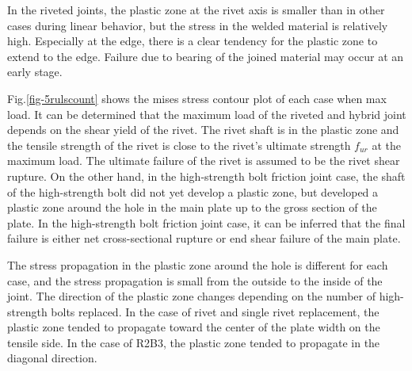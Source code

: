 In the riveted joints, the plastic zone at the rivet axis is smaller than in other cases during linear behavior, but the stress in the welded material is relatively high. Especially at the edge, there is a clear tendency for the plastic zone to extend to the edge. Failure due to bearing of the joined material may occur at an early stage.


Fig.\ref{fig-5rulscount} shows the mises stress contour plot of each case when max load. It can be determined that the maximum load of the riveted and hybrid joint depends on the shear yield of the rivet. The rivet shaft is in the plastic zone and the tensile strength of the rivet is close to the rivet's ultimate strength $f_{ur}$ at the maximum load. The ultimate failure of the rivet is assumed to be the rivet shear rupture. On the other hand, in the high-strength bolt friction joint case, the shaft of the high-strength bolt did not yet develop a plastic zone, but developed a plastic zone around the hole in the main plate up to the gross section of the plate. In the high-strength bolt friction joint case, it can be inferred that the final failure is either net cross-sectional rupture or end shear failure of the main plate. 

The stress propagation in the plastic zone around the hole is different for each case, and the stress propagation is small from the outside to the inside of the joint. The direction of the plastic zone changes depending on the number of high-strength bolts replaced. In the case of rivet and single rivet replacement, the plastic zone tended to propagate toward the center of the plate width on the tensile side. In the case of R2B3, the plastic zone tended to propagate in the diagonal direction.

